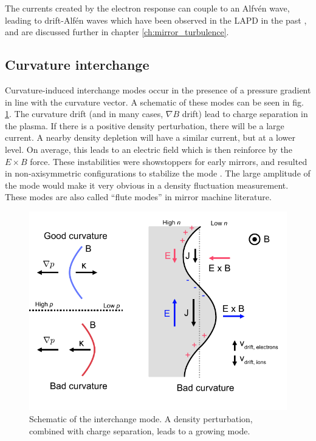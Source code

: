 The currents created by the electron response can couple to an Alfv\'en wave, leading to drift-Alf\'en waves which have been observed in the LAPD in the past \cite{Maggs_1997, Vincena_2006}, and are discussed further in chapter \ref{ch:mirror_turbulence}.

\subsection{Curvature interchange}

Curvature-induced interchange modes occur in the presence of a pressure gradient in line with the curvature vector. A schematic of these modes can be seen in fig. \ref{fig:interchange}. The curvature drift (and in many cases, $\nabla B$ drift) lead to charge separation in the plasma. If there is a positive density perturbation, there will be a large current. A nearby density depletion will have a similar current, but at a lower level. On average, this leads to an electric field which is then reinforce by the $E \times B$ force. These instabilities were showstoppers for early mirrors, and resulted in non-axisymmetric configurations to stabilize the mode \cite{Post_1987}. The large amplitude of the mode would make it very obvious in a density fluctuation measurement. These modes are also called ``flute modes'' in mirror machine literature.

\begin{figure}
	\centering
	\includegraphics[width=400pt]{figures/interchange.pdf}
	\caption[Schematic of an interchange mode]{\label{fig:interchange}Schematic of the interchange mode. A density perturbation, combined with charge separation, leads to a growing mode.}
\end{figure}

